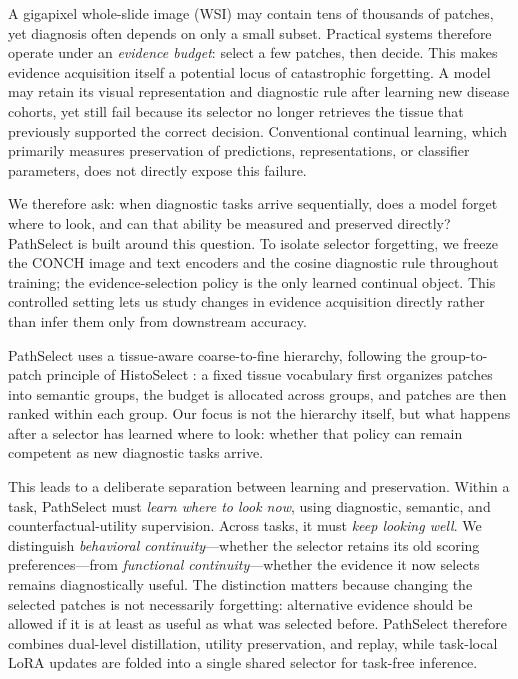 \documentclass{article}
\begin{document}
A gigapixel whole-slide image (WSI) may contain tens of thousands of patches, yet diagnosis often depends on only a small subset. Practical systems therefore operate under an \emph{evidence budget}: select a few patches, then decide. This makes evidence acquisition itself a potential locus of catastrophic forgetting. A model may retain its visual representation and diagnostic rule after learning new disease cohorts, yet still fail because its selector no longer retrieves the tissue that previously supported the correct decision. Conventional continual learning, which primarily measures preservation of predictions, representations, or classifier parameters, does not directly expose this failure.

We therefore ask: when diagnostic tasks arrive sequentially, does a model forget where to look, and can that ability be measured and preserved directly? PathSelect is built around this question. To isolate selector forgetting, we freeze the CONCH image and text encoders \cite{lu2024conch} and the cosine diagnostic rule throughout training; the evidence-selection policy is the only learned continual object. This controlled setting lets us study changes in evidence acquisition directly rather than infer them only from downstream accuracy.

PathSelect uses a tissue-aware coarse-to-fine hierarchy, following the group-to-patch principle of HistoSelect \cite{huang2026histoselect}: a fixed tissue vocabulary first organizes patches into semantic groups, the budget is allocated across groups, and patches are then ranked within each group. Our focus is not the hierarchy itself, but what happens after a selector has learned where to look: whether that policy can remain competent as new diagnostic tasks arrive.

This leads to a deliberate separation between learning and preservation. Within a task, PathSelect must \emph{learn where to look now}, using diagnostic, semantic, and counterfactual-utility supervision. Across tasks, it must \emph{keep looking well}. We distinguish \emph{behavioral continuity}---whether the selector retains its old scoring preferences---from \emph{functional continuity}---whether the evidence it now selects remains diagnostically useful. The distinction matters because changing the selected patches is not necessarily forgetting: alternative evidence should be allowed if it is at least as useful as what was selected before. PathSelect therefore combines dual-level distillation, utility preservation, and replay, while task-local LoRA updates are folded into a single shared selector for task-free inference.
\end{document}
